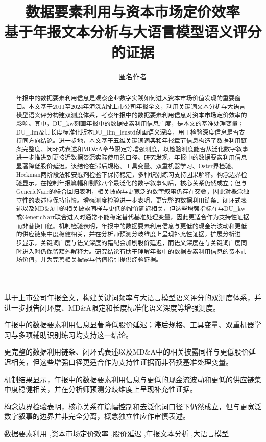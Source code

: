 \documentclass[preprint,12pt]{elsarticle}
\begin{document}
\begin{frontmatter}

\title{数据要素利用与资本市场定价效率\\
\large 基于年报文本分析与大语言模型语义评分的证据}

\author{匿名作者}

\begin{abstract}
年报中的数据要素利用信息是观察企业数字实践如何进入资本市场价值发现的重要窗口。本文基于2011至2024年沪深A股上市公司年报全文，利用关键词文本分析与大语言模型语义评分构建双测度体系，考察年报中的数据要素利用信息对资本市场定价效率的影响。其中，DU\_kw刻画年报中的数据要素利用信息广度，是本文的基准处理变量；DU\_llm及其长度标准化版本DU\_llm\_lenstd刻画语义深度，用于检验深度信息是否支持同方向结论。进一步地，本文基于五维关键词词典和年报章节信息构造了数据利用链条完整度、闭环式表述和MD\&A章节限定等增强测度，以检验测度能否从泛化数字叙事进一步推进到更接近数据资源实际使用的口径。研究发现，年报中的数据要素利用信息显著降低股价延迟。该结论在滞后规格、工具变量、双重机器学习、Oster界检验、Heckman两阶段法和安慰剂检验下保持稳定，多种识别练习支持因果解释。构念边界检验显示，在控制年报篇幅和剔除八个最泛化的数字叙事词后，核心关系仍然成立；但与GenericNarr的联合回归表明，相关披露与更宽泛的数字叙事仍存在交叠，因此对概念独立性的表述应保持审慎。增强测度检验进一步表明，更完整的数据利用链条、闭环式表述以及MD\&A中的相关披露同样与更低的股价延迟相关，但这些增强指标在与DU\_kw或GenericNarr联合进入时通常不能稳定替代基准处理变量，因此更适合作为支持性证据而非替换口径。机制检验表明，年报中的数据要素利用信息与更低的现金流波动和更低的供应链集中度稳健相关，并在分析师预测分歧维度上呈现补充性证据。扩展分析进一步显示，关键词广度与语义深度的错配会加剧股价延迟，而语义深度在与关键词广度同时进入时仍保留额外解释力。研究结论有助于理解年报中的数据要素利用信息的资本市场价值，并为完善相关披露与估值指引提供经验证据。
\end{abstract}

\begin{highlights}
\item 基于上市公司年报全文，构建关键词频率与大语言模型语义评分的双测度体系，并进一步报告闭环度、MD\&A限定和长度标准化语义深度等增强测度。
\item 年报中的数据要素利用信息显著降低股价延迟；滞后规格、工具变量、双重机器学习与多项辅助识别练习均支持这一结论。
\item 更完整的数据利用链条、闭环式表述以及MD\&A中的相关披露同样与更低股价延迟相关，但这些增强口径更适合作为支持性证据而非替换基准处理变量。
\item 机制结果显示，年报中的数据要素利用信息与更低的现金流波动和更低的供应链集中度稳健相关，并在分析师预测分歧维度上呈现补充性证据。
\item 构念边界检验表明，核心关系在篇幅控制和去泛化词口径下仍然成立，但与更宽泛数字叙事的边界并非完全分离，概念独立性应作审慎表述。
\end{highlights}

\begin{keyword}
数据要素利用 \sep 资本市场定价效率 \sep 股价延迟 \sep 年报文本分析 \sep 大语言模型
\end{keyword}

\end{frontmatter}
\end{document}
